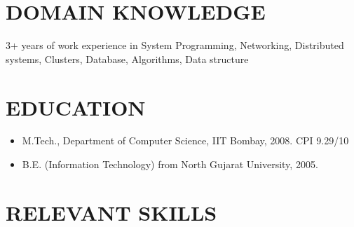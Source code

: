 \documentclass{res}
\begin{document}
\thispagestyle{empty} %

\address{ \\ \\ \\}

\address{  \\ chandarana [at] gmail.com \\ 91-9379228622\\ }

\begin{resume}

					 \section{DOMAIN KNOWLEDGE}

					 3+ years of work experience in System Programming, Networking, Distributed systems, Clusters, Database, Algorithms, Data structure 
					  
					  \section{EDUCATION}
					  \begin{itemize}
					  \item M.Tech., Department of Computer Science, IIT Bombay, 2008. CPI 9.29/10 
					  \item B.E. (Information Technology) from North Gujarat University, 2005. 
					  \end{itemize}

					  \section{RELEVANT SKILLS}


\end{resume}
\end{document}
